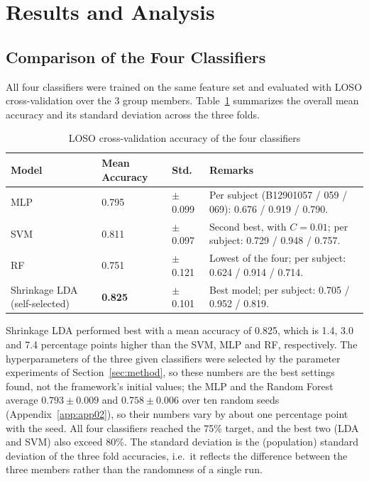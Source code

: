 \newpage
\section{Results and Analysis}\label{sec:result}

\subsection{Comparison of the Four Classifiers}
All four classifiers were trained on the same feature set and evaluated with LOSO cross-validation over the 3 group members. Table~\ref{tab:model_comparison} summarizes the overall mean accuracy and its standard deviation across the three folds.

\begin{table}[!htb]
    \centering
    \caption{LOSO cross-validation accuracy of the four classifiers}
    \label{tab:model_comparison}
    \begin{tabularx}{\textwidth}{@{} l l l X @{}}
        \toprule
        \textbf{Model} & \textbf{Mean Accuracy} & \textbf{Std.} & \textbf{Remarks} \\
        \midrule
        MLP & 0.795 & $\pm$ 0.099 & Per subject (B12901057 / 059 / 069): 0.676 / 0.919 / 0.790. \\
        SVM & 0.811 & $\pm$ 0.097 & Second best, with $C=0.01$; per subject: 0.729 / 0.948 / 0.757. \\
        RF  & 0.751 & $\pm$ 0.121 & Lowest of the four; per subject: 0.624 / 0.914 / 0.714. \\
        Shrinkage LDA (self-selected) & \textbf{0.825} & $\pm$ 0.101 & Best model; per subject: 0.705 / 0.952 / 0.819. \\
        \bottomrule
    \end{tabularx}
\end{table}

\noindent Shrinkage LDA performed best with a mean accuracy of 0.825, which is 1.4, 3.0 and 7.4 percentage points higher than the SVM, MLP and RF, respectively. The hyperparameters of the three given classifiers were selected by the parameter experiments of Section~\ref{sec:method}, so these numbers are the best settings found, not the framework's initial values; the MLP and the Random Forest average $0.793 \pm 0.009$ and $0.758 \pm 0.006$ over ten random seeds (Appendix~\ref{app:app02}), so their numbers vary by about one percentage point with the seed. All four classifiers reached the 75\% target, and the best two (LDA and SVM) also exceed 80\%. The standard deviation is the (population) standard deviation of the three fold accuracies, i.e.\ it reflects the difference between the three members rather than the randomness of a single run.

